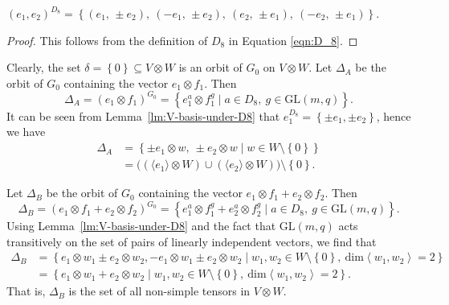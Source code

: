 \documentclass[ALCO, Unicode]{cedram}
\newcommand{\GL}{\mathrm{GL}}
\begin{document}
\begin{lemma} \label{lm:V-basis-under-D8}
$\left(e_1, e_2 \right)^{D_8} = \left\{{\left(e_1,\, \pm e_2 \right)},\ {\left(-e_1,\, \pm e_2 \right)},\ {\left(e_2,\, \pm e_1 \right)},\ \left(-e_2,\, \pm e_1 \right)\right\}$.
\end{lemma}
\begin{proof}
This follows from the definition of $D_8$ in Equation \eqref{eqn:D_8}.
\end{proof}

Clearly, the set $\delta = \left\{0 \right\} \subseteq V \otimes W$ is an orbit of $G_0$ on $V \otimes W$. Let $\Delta_A$ be the orbit of $G_0$ containing the vector $e_1 \otimes f_1$. Then
\begin{displaymath}
\Delta_A = \left(e_1 \otimes f_1 \right)^{G_0} = {\left\{e_1^a \otimes f_1^g \mid a \in D_8,\ g \in \GL {\left(m, q \right)}\right\}}.
\end{displaymath}
It can be seen from Lemma~\ref{lm:V-basis-under-D8} that $e_1^{D_8} = \left\{\pm e_1, \pm e_2 \right\}$, hence we have
\begin{align*}
\Delta_A &= \left\{\pm e_1 \otimes w,\ \pm e_2 \otimes w \mid w \in W \setminus \left\{0 \right\}\right\} \\
&= \big(\left(\langle e_1 \rangle \otimes W \right) \cup \left(\langle e_2 \rangle \otimes W \right)\big) \setminus {\left\{0 \right\}}.
\end{align*}

Let $\Delta_B$ be the orbit of $G_0$ containing the vector $e_1 \otimes f_1 + e_2 \otimes f_2$. Then
\begin{displaymath}
\Delta_B = \left(e_1 \otimes f_1 + e_2 \otimes f_2 \right)^{G_0} = {\left\{e_1^a \otimes f_1^g + e_2^a \otimes f_2^g \mid a \in D_8,\ g \in \GL{\left(m, q \right)}\right\}}.
\end{displaymath}
Using Lemma~\ref{lm:V-basis-under-D8} and the fact that $\GL{\left(m, q \right)}$ acts transitively on the set of pairs of linearly independent vectors, we find that
\begin{align*}
\Delta_B &= {\left\{e_1 \otimes w_1 \pm e_2 \otimes w_2, -e_1 \otimes w_1 \pm e_2 \otimes w_2 \mid w_1, w_2 \in W{\setminus} {\left\{0 \right\}},\ \mathrm{dim} \left<w_1, w_2 \right> = 2 \right\}} \\
&= {\left\{e_1 \otimes w_1 + e_2 \otimes w_2 \mid w_1, w_2 \in W \setminus {\left\{0 \right\}},\ \mathrm{dim} \left<w_1, w_2 \right> = 2 \right\}}.
\end{align*}
That is, $\Delta_B$ is the set of all non-simple tensors in $V \otimes W$.
\end{document}
